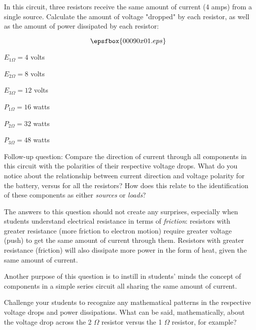 

In this circuit, three resistors receive the same amount of current (4 amps) from a single source.  Calculate the amount of voltage "dropped" by each resistor, as well as the amount of power dissipated by each resistor:

$$\epsfbox{00090x01.eps}$$







$E_{1 \Omega} = 4$ volts

$E_{2 \Omega} = 8$ volts

$E_{3 \Omega} = 12$ volts

\vskip 10pt

$P_{1 \Omega} = 16$ watts

$P_{2 \Omega} = 32$ watts

$P_{3 \Omega} = 48$ watts

\vskip 10pt

Follow-up question: Compare the direction of current through all components in this circuit with the polarities of their respective voltage drops.  What do you notice about the relationship between current direction and voltage polarity for the battery, versus for all the resistors?  How does this relate to the identification of these components as either {\it sources} or {\it loads}?







The answers to this question should not create any surprises, especially when students understand electrical resistance in terms of {\it friction}: resistors with greater resistance (more friction to electron motion) require greater voltage (push) to get the same amount of current through them.  Resistors with greater resistance (friction) will also dissipate more power in the form of heat, given the same amount of current.

Another purpose of this question is to instill in students' minds the concept of components in a simple series circuit all sharing the same amount of current.

Challenge your students to recognize any mathematical patterns in the respective voltage drops and power dissipations.  What can be said, mathematically, about the voltage drop across the 2 $\Omega$ resistor versus the 1 $\Omega$ resistor, for example?




